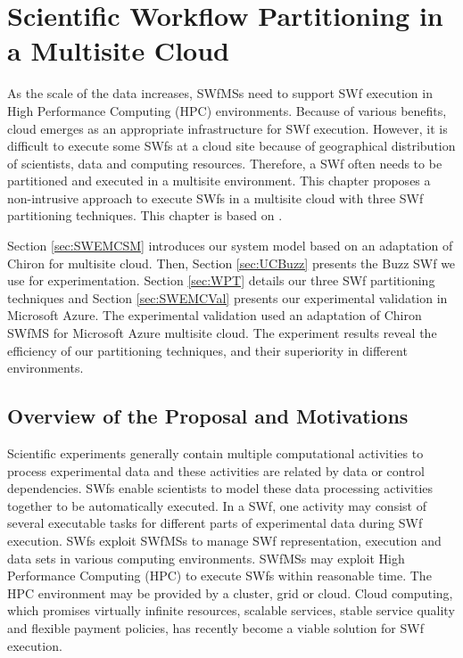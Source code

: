 \chapter{Scientific Workflow Partitioning in a Multisite Cloud} \label{SWPMC}

As the scale of the data increases, SWfMSs need to support SWf execution in High Performance Computing (HPC) environments. Because of various benefits, cloud emerges as an appropriate infrastructure for SWf execution. 
However, it is difficult to execute some SWfs at a cloud site because of geographical distribution of scientists, data and computing resources. Therefore, a SWf often needs to be partitioned and executed in a multisite environment. 
This chapter proposes a non-intrusive approach to execute SWfs in a multisite cloud with three SWf partitioning techniques. This chapter is based on \cite{Liu2014}.

Section \ref{sec:SWEMCSM} introduces our system model based on an adaptation of Chiron for multisite cloud. Then, Section \ref{sec:UCBuzz} presents the Buzz SWf we use for experimentation. Section \ref{sec:WPT} details our three SWf partitioning techniques and Section \ref{sec:SWEMCVal} presents our experimental validation in Microsoft Azure. 
The experimental validation used an adaptation of Chiron SWfMS for Microsoft Azure multisite cloud. The experiment results reveal the efficiency of our partitioning techniques, and their superiority in different environments.

\section{Overview of the Proposal and Motivations}

Scientific experiments generally contain multiple computational activities to process experimental data and these activities are related by data or control dependencies. SWfs enable scientists to model these data processing activities together to be automatically executed. In a SWf, one activity may consist of several executable tasks for different parts of experimental data during SWf execution. SWfs exploit SWfMSs to manage SWf representation, execution and data sets in various computing environments. SWfMSs may exploit High Performance Computing (HPC) to execute SWfs within reasonable time. The HPC environment may be provided by a cluster, grid or cloud. Cloud computing, which promises virtually infinite resources, scalable services, stable service quality and flexible payment policies, has recently become a viable solution for SWf execution. 

